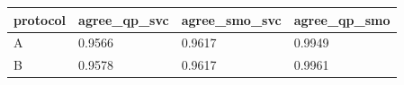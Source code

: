 \begin{tabular}{llll}
\hline
protocol & agree\_qp\_svc & agree\_smo\_svc & agree\_qp\_smo \\
\hline
A & 0.9566 & 0.9617 & 0.9949 \\
B & 0.9578 & 0.9617 & 0.9961 \\
\hline
\end{tabular}

